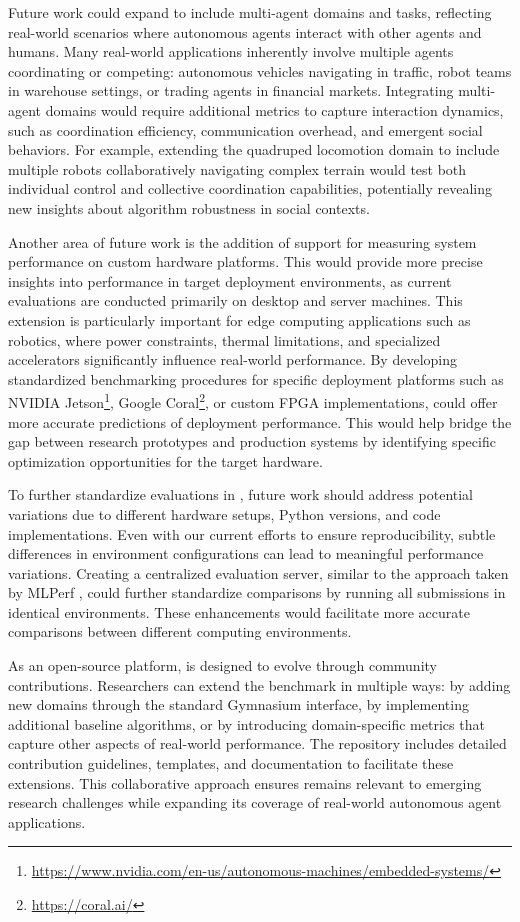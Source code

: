 Future work could expand \method to include multi-agent domains and tasks, reflecting real-world scenarios where autonomous agents interact with other agents and humans. Many real-world applications inherently involve multiple agents coordinating or competing: autonomous vehicles navigating in traffic, robot teams in warehouse settings, or trading agents in financial markets. Integrating multi-agent domains would require additional metrics to capture interaction dynamics, such as coordination efficiency, communication overhead, and emergent social behaviors. For example, extending the quadruped locomotion domain to include multiple robots collaboratively navigating complex terrain would test both individual control and collective coordination capabilities, potentially revealing new insights about algorithm robustness in social contexts.

Another area of future work is the addition of support for measuring system performance on custom hardware platforms.
This would provide more precise insights into performance in target deployment environments, as current evaluations are conducted primarily on desktop and server machines.
This extension is particularly important for edge computing applications such as robotics, where power constraints, thermal limitations, and specialized accelerators significantly influence real-world performance.
By developing standardized benchmarking procedures for specific deployment platforms such as NVIDIA Jetson\footnote{\url{https://www.nvidia.com/en-us/autonomous-machines/embedded-systems/}}, Google Coral\footnote{\url{https://coral.ai/}}, or custom FPGA implementations, \method could offer more accurate predictions of deployment performance. This would help bridge the gap between research prototypes and production systems by identifying specific optimization opportunities for the target hardware.

To further standardize evaluations in \method, future work should address potential variations due to different hardware setups, Python versions, and code implementations.
Even with our current efforts to ensure reproducibility, subtle differences in environment configurations can lead to meaningful performance variations.
Creating a centralized evaluation server, similar to the approach taken by MLPerf \cite{reddi2020mlperf}, could further standardize comparisons by running all submissions in identical environments. These enhancements would facilitate more accurate comparisons between different computing environments.

As an open-source platform, \method is designed to evolve through community contributions. Researchers can extend the benchmark in multiple ways: by adding new domains through the standard Gymnasium interface, by implementing additional baseline algorithms, or by introducing domain-specific metrics that capture other aspects of real-world performance. The repository includes detailed contribution guidelines, templates, and documentation to facilitate these extensions. This collaborative approach ensures \method remains relevant to emerging research challenges while expanding its coverage of real-world autonomous agent applications.
